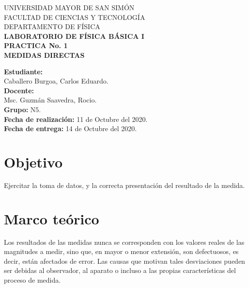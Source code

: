 \documentclass[letter,11pt]{article}
\newcommand{\blankpage}{
    \newpage
    \thispagestyle{empty}
    \mbox{}
    \newpage
}
\begin{document}
\begin{titlepage}
\begin{center}
{\Large UNIVERSIDAD MAYOR DE SAN SIMÓN}\\
\vspace*{0.15cm}
{\large FACULTAD DE CIENCIAS Y TECNOLOGÍA}\\
\vspace*{0.10cm}
DEPARTAMENTO DE FÍSICA\\
\vspace*{3.0cm}
{\Large \textbf{LABORATORIO DE FÍSICA BÁSICA I}}\\
\vspace*{0.3cm}
{\Large \textbf{PRACTICA No. 1}}\\
\vspace*{3.5cm}
{\Large \textbf{MEDIDAS DIRECTAS}}\\
\end{center}

\vspace*{7.4cm}
\leftskip=7.95cm
\noindent
\textbf{Estudiante:}\\
Caballero Burgoa, Carlos Eduardo.\\
\newline
\textbf{Docente:}\\
Msc. Guzmán Saavedra, Rocio.\\
\newline
\textbf{Grupo:} N5.\\
\textbf{Fecha de realización:} 11 de Octubre del 2020.\\
\textbf{Fecha de entrega:} 14 de Octubre del 2020.\\

\end{titlepage}

\blankpage

\section{Objetivo}
Ejercitar la toma de datos, y la correcta presentación del resultado de la
medida.

\section{Marco teórico}
Los resultados de las medidas nunca se corresponden con los valores reales de
las magnitudes a medir, sino que, en mayor o menor extensión, son defectuosos,
es decir, están afectados de error. Las causas que motivan tales desviaciones
pueden ser debidas al observador, al aparato o incluso a las propias
características del proceso de medida.
\end{document}
